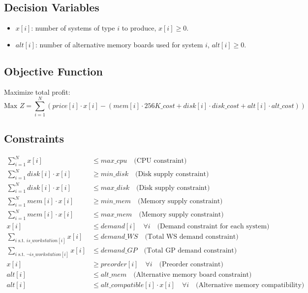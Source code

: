 \documentclass{article}
\begin{document}
\subsection*{Decision Variables}
\begin{itemize}
    \item \( x[i] \): number of systems of type \( i \) to produce, \( x[i] \geq 0 \).
    \item \( alt[i] \): number of alternative memory boards used for system \( i \), \( alt[i] \geq 0 \).
\end{itemize}

\subsection*{Objective Function}
Maximize total profit:
\[
\text{Max } Z = \sum_{i=1}^{N} \left( price[i] \cdot x[i] - (mem[i] \cdot 256K\_cost + disk[i] \cdot disk\_cost + alt[i] \cdot alt\_cost) \right)
\]

\subsection*{Constraints}
\begin{align}
    \sum_{i=1}^{N} x[i] & \leq max\_cpu \quad \text{(CPU constraint)} \\
    \sum_{i=1}^{N} disk[i] \cdot x[i] & \geq min\_disk \quad \text{(Disk supply constraint)} \\
    \sum_{i=1}^{N} disk[i] \cdot x[i] & \leq max\_disk \quad \text{(Disk supply constraint)} \\
    \sum_{i=1}^{N} mem[i] \cdot x[i] & \geq min\_mem \quad \text{(Memory supply constraint)} \\
    \sum_{i=1}^{N} mem[i] \cdot x[i] & \leq max\_mem \quad \text{(Memory supply constraint)} \\
    x[i] & \leq demand[i] \quad \forall i \quad \text{(Demand constraint for each system)} \\
    \sum_{i \text{ s.t. } is\_workstation[i]} x[i] & \leq demand\_WS \quad \text{(Total WS demand constraint)} \\
    \sum_{i \text{ s.t. } \neg is\_workstation[i]} x[i] & \leq demand\_GP \quad \text{(Total GP demand constraint)} \\
    x[i] & \geq preorder[i] \quad \forall i \quad \text{(Preorder constraint)} \\
    alt[i] & \leq alt\_mem \quad \text{(Alternative memory board constraint)} \\
    alt[i] & \leq alt\_compatible[i] \cdot  x[i] \quad \forall i \quad \text{(Alternative memory compatibility)}
\end{align}
\end{document}

